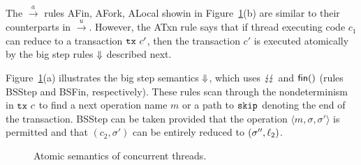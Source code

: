 The $\xrightarrow{a}$ rules {\sc AFin, AFork, ALocal} showin in 
Figure~\ref{fig:atomic}(b) are similar to
their counterparts in $\xrightarrow{u}$.
%
However, the {\sc ATxn} rule says that if thread executing code $c_1$ can reduce to a 
transaction $\texttt{tx}\ c'$, then the transaction $c'$ is executed
atomically by the big step rules $\Downarrow$ described next.

Figure~\ref{fig:atomic}(a) illustrates the
big step semantics $\Downarrow$, which uses $\lightning\!\lightning$ and $\textsf{fin}()$ 
(rules {\sc BSStep} and {\sc BSFin}, respectively). These rules
scan through the nondeterminism in $\texttt{tx}\ c$ to find a next operation
name $m$ or a path to $\texttt{skip}$ denoting the end of the transaction.
%
{\sc BSStep} can be taken provided that the operation $\langle m,\sigma,\sigma'\rangle$ is
permitted and that $(c_2,\sigma')$ can be
entirely reduced to $(\sigma'',\ell_2)$.









\begin{figure}
\caption{\label{fig:atomic} Atomic semantics of concurrent threads.}
\end{figure}

